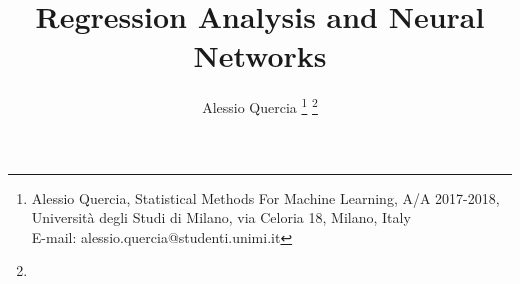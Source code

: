 \documentclass[10pt,journal,A4paper,compsoc,epsfig]{IEEEtran}
\begin{document}
%
\title{Regression Analysis and Neural Networks}
%
%
%
%




\author{Alessio Quercia
        \thanks{Alessio Quercia, Statistical Methods For Machine Learning,  A/A 2017-2018, Universit\`{a} degli Studi di Milano, via Celoria 18, Milano, Italy \protect\\
E-mail: alessio.quercia@studenti.unimi.it}%
\thanks{}}

% 
%
\end{document}
